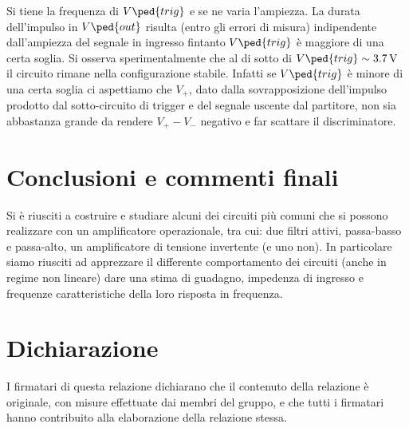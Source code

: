 \documentclass[10pt, a4paper, italian]{article}
\begin{document}
Si tiene la frequenza di $ V\ped{trig} $ e se ne varia l'ampiezza. La durata dell'impulso in $ V\ped{out} $ risulta (entro gli errori di misura) indipendente dall'ampiezza del segnale in ingresso fintanto $ V\ped{trig} $ è maggiore di una certa soglia. Si osserva sperimentalmente che al di sotto di $ V\ped{trig} \sim \SI{3.7}{\volt} $ il circuito rimane nella configurazione stabile. Infatti se $ V\ped{trig} $ è minore di una certa soglia ci aspettiamo che $ V_{+} $, dato dalla sovrapposizione dell'impulso prodotto dal sotto-circuito di trigger e del segnale uscente dal partitore, non sia abbastanza grande da rendere $ V_{+} - V_{-} $ negativo e far scattare il discriminatore.


\section*{Conclusioni e commenti finali}
Si è riusciti a costruire e studiare alcuni dei circuiti più comuni che si
possono realizzare con un amplificatore operazionale, tra cui: due filtri
attivi, passa-basso e passa-alto, un amplificatore di tensione invertente
(e uno non).
In particolare siamo riusciti ad apprezzare il differente comportamento dei
circuiti (anche in regime non lineare) dare una stima di guadagno, impedenza di
ingresso e frequenze caratteristiche della loro risposta in frequenza.

\section*{Dichiarazione}
I firmatari di questa relazione dichiarano che il contenuto della relazione \`e
originale, con misure effettuate dai membri del gruppo, e che tutti i firmatari
hanno contribuito alla elaborazione della relazione stessa.

\newpage
\end{document}
